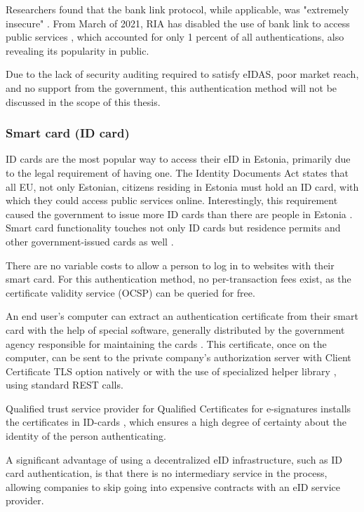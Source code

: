 Researchers found that the bank link protocol, while applicable, was "extremely insecure" \cite{banklinksecurityanalysis}. From March of 2021, RIA has disabled the use of bank link to access public services \cite{ria-deprecates-bank-link}, which accounted for only 1 percent of all authentications, also revealing its popularity in public.

Due to the lack of security auditing required to satisfy eIDAS, poor market reach, and no support from the government, this authentication method will not be discussed in the scope of this thesis.

\subsubsection{Smart card (ID card)}

ID cards are the most popular way to access their eID in Estonia, primarily due to the legal requirement of having one. The Identity Documents Act \cite{eelaw-idcard} states that all EU, not only Estonian, citizens residing in Estonia must hold an ID card, with which they could access public services online. Interestingly, this requirement caused the government to issue more ID cards than there are people in Estonia \cite{ria-idee,statee-population}. Smart card functionality touches not only ID cards but residence permits and other government-issued cards as well \cite{eulaw-eidas-notified}.

There are no variable costs to allow a person to log in to websites with their smart card. For this authentication method, no per-transaction fees exist, as the certificate validity service (OCSP) \cite{rfc6960} can be queried for free.

An end user's computer can extract an authentication certificate from their smart card with the help of special software, generally distributed by the government agency responsible for maintaining the cards \cite{ria-idee}. This certificate, once on the computer, can be sent to the private company's authorization server with Client Certificate TLS option \cite{rfc8446} natively or with the use of specialized helper library \cite{ria-webeid}, using standard REST calls.

Qualified trust service provider for Qualified Certificates for e-signatures installs the certificates in ID-cards \cite{eu-trustservices}, which ensures a high degree of certainty about the identity of the person authenticating.

A significant advantage of using a decentralized eID infrastructure, such as ID card authentication, is that there is no intermediary service in the process, allowing companies to skip going into expensive contracts with an eID service provider.

